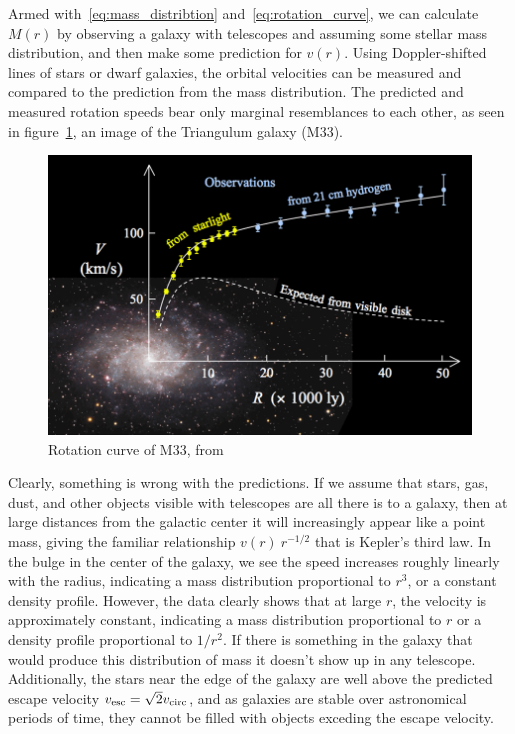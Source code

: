 Armed with~\eqref{eq:mass_distribtion} and~\eqref{eq:rotation_curve}, we can calculate $M(r)$ by observing a galaxy with telescopes and assuming some stellar mass distribution, and then make some prediction for $v(r)$. Using Doppler-shifted lines of stars or dwarf galaxies, the orbital velocities can be measured and compared to the prediction from the mass distribution. The predicted and measured rotation speeds bear only marginal resemblances to each other, as seen in figure~\ref{fig:rotation_curve}, an image of the Triangulum galaxy (M33).

\begin{figure}[h]
	\includegraphics{figures/chapter_one/rotation_curve.png}
	\caption{Rotation curve of M33, from~\cite{Corbelli:1999af}}
	\label{fig:rotation_curve}
\end{figure}

Clearly, something is wrong with the predictions. If we assume that stars, gas, dust, and other objects visible with telescopes are all there is to a galaxy, then at large distances from the galactic center it will increasingly appear like a point mass, giving the familiar relationship $v(r) ~ r^{-1/2}$ that is Kepler's third law. In the bulge in the center of the galaxy, we see the speed increases roughly linearly with the radius, indicating a mass distribution proportional to $r^3$, or a constant density profile. However, the data clearly shows that at large $r$, the velocity is approximately constant, indicating a mass distribution proportional to $r$ or a density profile proportional to $1/r^2$. If there is something in the galaxy that would produce this distribution of mass it doesn't show up in any telescope. Additionally, the stars near the edge of the galaxy are well above the predicted escape velocity $v_{\mathrm{esc}} = \sqrt{2}v_{\mathrm{circ}}$, and as galaxies are stable over astronomical periods of time, they cannot be filled with objects exceding the escape velocity.

